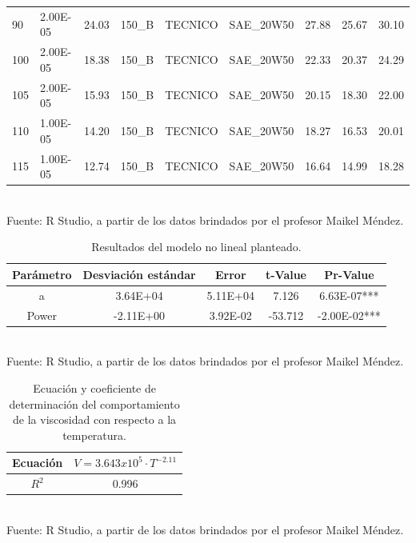 \documentclass[12, letterpaper]{article}
\begin{document}
\begin{table}[ht]
\begin{tabular}{p{1.8cm}|p{1.5cm}p{1.5cm}p{1.5cm}p{1.5cm}p{2cm}p{1.2cm}p{1.2cm}p{1.2cm}}
  90 & 2.00E-05 & 24.03 & 150\_B & TECNICO & SAE\_20W50 & 27.88 & 25.67 & 30.10 \\ 
  100 & 2.00E-05 & 18.38 & 150\_B & TECNICO & SAE\_20W50 & 22.33 & 20.37 & 24.29 \\ 
  105 & 2.00E-05 & 15.93 & 150\_B & TECNICO & SAE\_20W50 & 20.15 & 18.30 & 22.00 \\ 
  110 & 1.00E-05 & 14.20 & 150\_B & TECNICO & SAE\_20W50 & 18.27 & 16.53 & 20.01 \\ 
  115 & 1.00E-05 & 12.74 & 150\_B & TECNICO & SAE\_20W50 & 16.64 & 14.99 & 18.28 \\ 
   \hline
\end{tabular}\\
Fuente: R Studio, a partir de los datos brindados por el profesor Maikel Méndez.
\end{table}

\begin{table}[ht]
\centering
\caption{Resultados del modelo no lineal planteado.}
\begin{tabular}{ccccc}
  \hline
Parámetro & Desviación estándar & Error & t-Value  & Pr-Value \\ 
  \hline
  a & 3.64E+04 & 5.11E+04 & 7.126 & 6.63E-07*** \\ 
  Power & -2.11E+00 & 3.92E-02 & -53.712 & -2.00E-02*** \\ 
  \hline
\end{tabular}\\
Fuente: R Studio, a partir de los datos brindados por el profesor Maikel Méndez.
\end{table}

\begin{table}[ht]
\centering
\caption{Ecuación y coeficiente de determinación del comportamiento de la viscosidad con respecto a la temperatura.}
\begin{tabular}{cc}
  \hline
Ecuación & $V=3.643x10^{5}\cdot T^{-2.11}$ \\ 
  \hline
  $R^{2}$ & 0.996 \\ 
   \hline
\end{tabular}\\
Fuente: R Studio, a partir de los datos brindados por el profesor Maikel Méndez.
\end{table}
\end{document}
